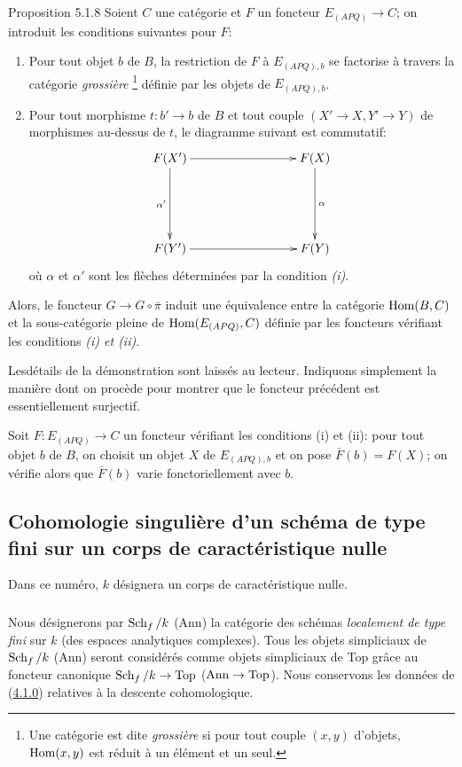 \documentclass[10pt]{../fichiers-configuration-latex/smfart}
\begin{document}
\begin{enonce*}{Proposition 5.1.8}
Soient $C$ une catégorie et $F$ un foncteur $E_{(APQ)} \to C$; on
introduit les conditions suivantes pour $F$:
\begin{enumerate}
\renewcommand{\theenumi}{\roman{enumi}}
\renewcommand{\labelenumi}{(\theenumi)}
\item Pour tout objet $b$ de $B$, la restriction de $F$ à $E_{(APQ), b}$ se
  factorise à travers la catégorie \emph{grossière} \footnote{Une catégorie
  est dite \emph{grossière} si pour tout couple $(x, y)$ d'objets,
  $\operatorname{Hom}(x, y)$ est réduit à un élément et un seul.} définie par les
  objets de $E_{(APQ), b}$.

\item Pour tout morphisme $t : b'\to b$ de $B$ et tout couple $(X'\to
  X, Y'\to Y)$ de morphismes au-dessus de $t$, le diagramme suivant
  est commutatif:
\[
\xymatrix@C=3cm@R=2cm{
F(X')         \ar[r]  \ar[d]_{\alpha'}& F(X)\ar[d]^{\alpha}\\
F(Y')          \ar[r] & F(Y)
}
\]
où $\alpha$ et ${\alpha}'$ sont les flèches déterminées par la
condition \emph{(i)}.
\end{enumerate}

Alors, le foncteur $G \to G \circ \bar{\pi}$ induit une équivalence
entre la catégorie $\operatorname{Hom}(B, C)$ et la sous-catégorie pleine de
$\operatorname{Hom}(E_{(APQ)}, C)$ définie par les foncteurs vérifiant les
conditions \emph{(i) et (ii)}.
\end{enonce*}

Les\pageoriginale détails de la démonstration sont laissés au
lecteur. Indiquons simplement la manière dont on procède pour montrer que le foncteur
précédent est essentiellement surjectif.

Soit $F : E_{(APQ)} \to C$ un foncteur vérifiant les conditions (i) et
(ii): pour tout objet $b$ de $B$, on choisit un objet $X$ de
$E_{(APQ), b}$ et on pose $\bar{F}(b) = F(X)$; on vérifie alors que
$\bar{F}(b)$ varie fonctoriellement avec $b$.

\subsection{Cohomologie singulière d'un schéma de type fini sur un
  corps de caractéristique nulle}

Dans ce numéro, $k$ désignera un corps de caractéristique nulle.

\setcounter{subsubsection}{-1}
\subsubsection{}
Nous désignerons par $\operatorname{Sch}_f /k$ (\resp Ann) la catégorie des schémas
\emph{localement de type fini} sur $k$ (\resp des espaces analytiques
complexes). Tous les objets simpliciaux de $\operatorname{Sch}_f /k$ (\resp Ann)
seront considérés comme objets simpliciaux de Top grâce au foncteur
canonique $\Sch_f /k \to  \Top$ (\resp $\Ann \to \Top$). Nous conservons
les données de (\hyperref[Vbis.subsubsec4.1.0]{4.1.0}) relatives à la descente cohomologique.
\end{document}
